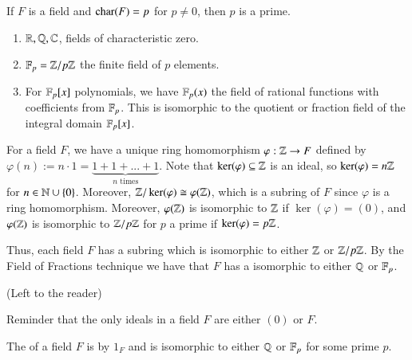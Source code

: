 \documentclass[12pt, a4paper, twoside, openright, titlepage]{book}
\begin{document}
\begin{rmk}{}{}
    If $F$ is a field and $\operatorname{char}(F) = p$ for $p \neq 0$, then $p$ is a prime.
\end{rmk}

\begin{eg}{}{}
    \leavevmode
    \begin{enumerate}
        \item $\mathbb R, \mathbb Q, \mathbb C$, fields of characteristic zero.
        \item $\mathbb F_p = \mathbb Z/p\mathbb Z$ the finite field of $p$ elements.
        \item For $\mathbb F_p[x]$ polynomials, we have $\mathbb F_p(x)$ the field of rational functions with coefficients from $\mathbb F_p$. This is isomorphic to the quotient or fraction field of the integral domain $\mathbb F_p[x]$.
    \end{enumerate}
\end{eg}

\begin{rmk}{}{}
    For a field $F$, we have a unique ring homomorphism $\varphi:\mathbb Z\rightarrow F$ defined by $\varphi(n) := n\cdot 1 = \underbrace{1+1+...+1}_{\text{$n$ times}}$. Note that $\ker(\varphi) \subseteq \mathbb Z$ is an ideal, so $\ker(\varphi) = n\mathbb Z$ for $n \in \mathbb N\cup \{0\}$. Moreover, $\mathbb Z/\ker(\varphi) \cong \varphi(\mathbb Z)$, which is a subring of $F$ since $\varphi$ is a ring homomorphism. Moreover, $\varphi(\mathbb Z)$ is isomorphic to $\mathbb Z$ if $\ker(\varphi) = (0)$, and $\varphi(\mathbb Z)$ is isomorphic to $\mathbb Z/p\mathbb Z$ for $p$ a prime if $\ker(\varphi) = p\mathbb Z$. 

    Thus, each field $F$ has a subring which is isomorphic to either $\mathbb Z$ or $\mathbb Z/p\mathbb Z$. By the Field of Fractions technique we have that $F$ has a  isomorphic to either $\mathbb Q$ or $\mathbb F_p$.
\end{rmk}
\begin{proof*}{}{}
    (Left to the reader)
\end{proof*}


\begin{rec*}{}{}
    Reminder that the only ideals in a field $F$ are either $(0)$ or $F$.
\end{rec*}


\begin{defn}{}{}
    The  of a field $F$ is  by $1_F$ and is isomorphic to either $\mathbb Q$ or $\mathbb F_p$ for some prime $p$.
\end{defn}




\end{document}
